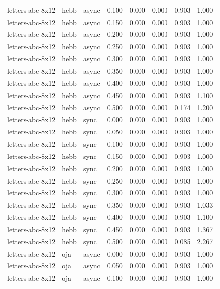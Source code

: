 \begin{tabular}{lllrrrrr}
letters-abc-8x12 & hebb & async & 0.100 & 0.000 & 0.000 & 0.903 & 1.000 \\
letters-abc-8x12 & hebb & async & 0.150 & 0.000 & 0.000 & 0.903 & 1.000 \\
letters-abc-8x12 & hebb & async & 0.200 & 0.000 & 0.000 & 0.903 & 1.000 \\
letters-abc-8x12 & hebb & async & 0.250 & 0.000 & 0.000 & 0.903 & 1.000 \\
letters-abc-8x12 & hebb & async & 0.300 & 0.000 & 0.000 & 0.903 & 1.000 \\
letters-abc-8x12 & hebb & async & 0.350 & 0.000 & 0.000 & 0.903 & 1.000 \\
letters-abc-8x12 & hebb & async & 0.400 & 0.000 & 0.000 & 0.903 & 1.000 \\
letters-abc-8x12 & hebb & async & 0.450 & 0.000 & 0.000 & 0.903 & 1.100 \\
letters-abc-8x12 & hebb & async & 0.500 & 0.000 & 0.000 & 0.174 & 1.200 \\
letters-abc-8x12 & hebb & sync & 0.000 & 0.000 & 0.000 & 0.903 & 1.000 \\
letters-abc-8x12 & hebb & sync & 0.050 & 0.000 & 0.000 & 0.903 & 1.000 \\
letters-abc-8x12 & hebb & sync & 0.100 & 0.000 & 0.000 & 0.903 & 1.000 \\
letters-abc-8x12 & hebb & sync & 0.150 & 0.000 & 0.000 & 0.903 & 1.000 \\
letters-abc-8x12 & hebb & sync & 0.200 & 0.000 & 0.000 & 0.903 & 1.000 \\
letters-abc-8x12 & hebb & sync & 0.250 & 0.000 & 0.000 & 0.903 & 1.000 \\
letters-abc-8x12 & hebb & sync & 0.300 & 0.000 & 0.000 & 0.903 & 1.000 \\
letters-abc-8x12 & hebb & sync & 0.350 & 0.000 & 0.000 & 0.903 & 1.033 \\
letters-abc-8x12 & hebb & sync & 0.400 & 0.000 & 0.000 & 0.903 & 1.100 \\
letters-abc-8x12 & hebb & sync & 0.450 & 0.000 & 0.000 & 0.903 & 1.367 \\
letters-abc-8x12 & hebb & sync & 0.500 & 0.000 & 0.000 & 0.085 & 2.267 \\
letters-abc-8x12 & oja & async & 0.000 & 0.000 & 0.000 & 0.903 & 1.000 \\
letters-abc-8x12 & oja & async & 0.050 & 0.000 & 0.000 & 0.903 & 1.000 \\
letters-abc-8x12 & oja & async & 0.100 & 0.000 & 0.000 & 0.903 & 1.000 \\

\end{tabular}
